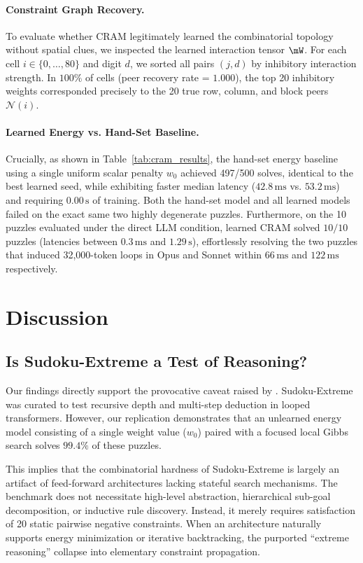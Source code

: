 \documentclass{article} %
\begin{document}
\paragraph{Constraint Graph Recovery.}
To evaluate whether CRAM legitimately learned the combinatorial topology without spatial clues, we inspected the learned interaction tensor $\mW$. For each cell $i \in \{0, \dots, 80\}$ and digit $d$, we sorted all pairs $(j, d)$ by inhibitory interaction strength. In $100\%$ of cells (peer recovery rate = $1.000$), the top 20 inhibitory weights corresponded precisely to the 20 true row, column, and block peers $\mathcal{N}(i)$.

\paragraph{Learned Energy vs. Hand-Set Baseline.}
Crucially, as shown in Table~\ref{tab:cram_results}, the hand-set energy baseline using a single uniform scalar penalty $w_0$ achieved 497/500 solves, identical to the best learned seed, while exhibiting faster median latency ($42.8\,\mathrm{ms}$ vs. $53.2\,\mathrm{ms}$) and requiring $0.00\,\mathrm{s}$ of training. Both the hand-set model and all learned models failed on the exact same two highly degenerate puzzles. Furthermore, on the 10 puzzles evaluated under the direct LLM condition, learned CRAM solved $10/10$ puzzles (latencies between $0.3\,\mathrm{ms}$ and $1.29\,\mathrm{s}$), effortlessly resolving the two puzzles that induced 32,000-token loops in Opus and Sonnet within $66\,\mathrm{ms}$ and $122\,\mathrm{ms}$ respectively.

\section{Discussion}
\label{sec:discussion}

\subsection{Is Sudoku-Extreme a Test of Reasoning?}
Our findings directly support the provocative caveat raised by \citet{hoover2026cram}. Sudoku-Extreme was curated to test recursive depth and multi-step deduction in looped transformers. However, our replication demonstrates that an unlearned energy model consisting of a single weight value ($w_0$) paired with a focused local Gibbs search solves $99.4\%$ of these puzzles. 

This implies that the combinatorial hardness of Sudoku-Extreme is largely an artifact of feed-forward architectures lacking stateful search mechanisms. The benchmark does not necessitate high-level abstraction, hierarchical sub-goal decomposition, or inductive rule discovery. Instead, it merely requires satisfaction of 20 static pairwise negative constraints. When an architecture naturally supports energy minimization or iterative backtracking, the purported ``extreme reasoning'' collapse into elementary constraint propagation.
\end{document}
